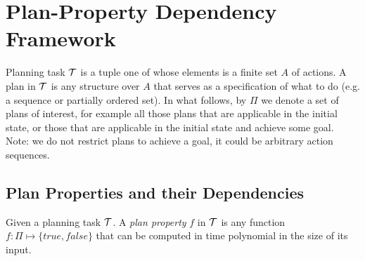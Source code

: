 \section{Plan-Property Dependency Framework}




Planning task $\cal T$ is a tuple one of whose elements is a finite
set $A$ of actions. A plan in $\cal T$ is any structure over $A$ that
serves as a specification of what to do (e.g. a sequence or partially
ordered set). In what follows, by $\Pi$ we denote a set of plans of
interest, for example all those plans that are applicable in the
initial state, or those that are applicable in the initial state and
achieve some goal. Note: we do not restrict plans to achieve a goal,
it could be arbitrary action sequences.


\subsection{Plan Properties and their Dependencies}


%

\begin{definition}
Given a planning task $\cal T$. A \emph{plan property} $f$ in $\cal T$
is any function $f : \Pi \mapsto \{true, false\}$ that can be computed
in time polynomial in the size of its input.
\end{definition}



%
%

